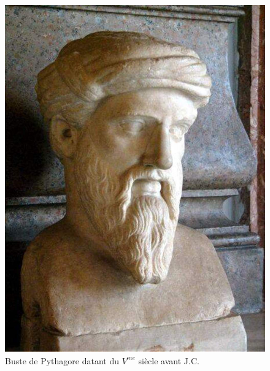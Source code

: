 \documentclass[a4paper,12pt]{article}
\begin{document}
\begin{remark}
\begin{figure}[H]\label{fig:pythagore}
    \centering
    \includegraphics[scale=0.3]{theorems/pythagore/pythagore.jpg}
    
    \caption{Buste de Pythagore datant du $V^{me}$ siècle avant J.C.}
    \label{fig:thales}
\end{figure}

\end{remark}
\end{document}
